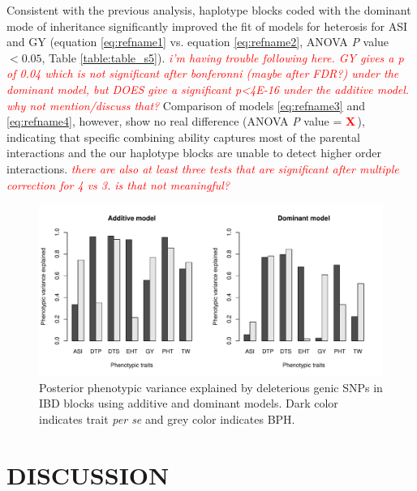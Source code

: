 \documentclass[twoside,twocolumn, letterpaper]{article}
\newcommand{\X}{\textcolor{red}{\bf X\,}}
\newcommand{\jri}[1]{\textcolor{red}{ \emph{ #1}} }
\begin{document}
Consistent with the previous analysis, haplotype blocks coded with the dominant mode of inheritance significantly improved the fit of models for heterosis for ASI and GY (equation \ref{eq:refname1} vs. equation \ref{eq:refname2}, ANOVA \emph{P} value $<0.05$, Table \ref{table:table_s5}). \jri{i'm having trouble following here.  GY gives a p of 0.04 which is not significant after bonferonni (maybe after FDR?) under the dominant model, but DOES give a significant p<4E-16 under the additive model. why not mention/discuss that? }
Comparison of models \ref{eq:refname3} and \ref{eq:refname4}, however, show no real difference (ANOVA \emph{P} value = \X), indicating that specific combining ability captures most of the parental interactions and the our haplotype blocks are unable to detect higher order interactions. \jri{ there are also at least three tests that are significant after multiple correction for 4 vs 3. is that not meaningful?} 


\begin{figure}[htbp]
\centering
\includegraphics[width=\linewidth]{Figure_h2.pdf}
\caption{Posterior phenotypic variance explained by deleterious genic SNPs in IBD blocks using additive and dominant models. Dark color indicates trait \emph{per se} and grey color indicates BPH. }  
\label{fig:h2}
\end{figure}


\section*{DISCUSSION}
\end{document}
